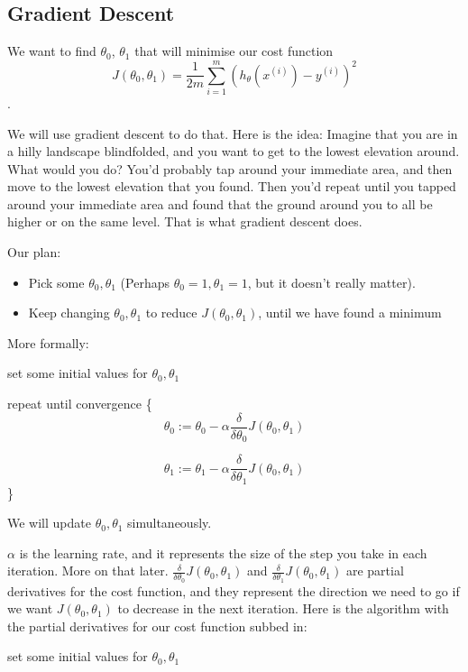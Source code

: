 \documentclass[11pt]{article}
\begin{document}
    \subsection{Gradient Descent}

    We want to find $\theta_0$, $\theta_1$ that will minimise our cost function \[J(\theta_0, \theta_1) = \frac{1}{2m} \sum^m_{i=1}(h_\theta(x^{(i)}) - y^{(i)})^2\].

    We will use gradient descent to do that. Here is the idea: Imagine that you are in a hilly landscape blindfolded, and you want to get to the lowest elevation around. What would you do? You'd probably tap around your immediate area, and then move to the lowest elevation that you found. Then you'd repeat until you tapped around your immediate area and found that the ground around you to all be higher or on the same level. That is what gradient descent does.

    Our plan:
    \begin{itemize}
        \item Pick some $\theta_0, \theta_1$ (Perhaps $\theta_0=1, \theta_1=1$, but it doesn't really matter).
        \item Keep changing  $\theta_0, \theta_1$ to reduce $J(\theta_0, \theta_1)$, until we have found a minimum
    \end{itemize}

    More formally:

    set some initial values for $\theta_0, \theta_1$

    repeat until convergence \{
    \[\theta_0 := \theta_0 - \alpha \frac{\delta}{\delta \theta_0} J(\theta_0, \theta_1)\]

    \[\theta_1 := \theta_1 - \alpha \frac{\delta}{\delta \theta_1} J(\theta_0, \theta_1)\]
    \}


    We will update  $\theta_0, \theta_1$ simultaneously.

    $\alpha$ is the learning rate, and it represents the size of the step you take in each iteration. More on that later.  $\frac{\delta}{\delta \theta_0} J(\theta_0, \theta_1) $ and $\frac{\delta}{\delta \theta_1} J(\theta_0, \theta_1) $ are partial derivatives for the cost function, and they represent the direction we need to go if we want $J(\theta_0, \theta_1)$ to decrease in the next iteration. Here is the algorithm with the partial derivatives for our cost function subbed in:

    set some initial values for $\theta_0, \theta_1$
\end{document}
